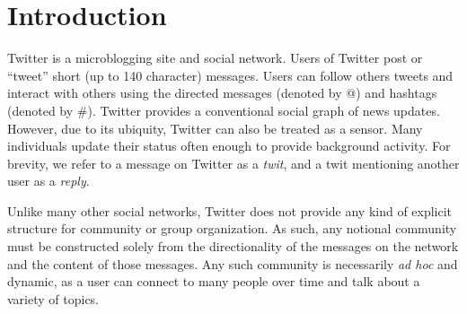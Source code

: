 \section{Introduction}

Twitter is a microblogging site and social network.  Users of Twitter post or ``tweet'' short (up to 140 character) messages.  Users can follow others tweets and interact with others using the directed messages (denoted by @) and hashtags (denoted by \#). Twitter provides a conventional social graph of news updates.  However, due to its ubiquity, Twitter can also be treated as a sensor.  Many individuals update their status often enough to provide background activity.  For brevity, we refer to a message on Twitter as a \emph{twit}, and a twit mentioning another user as a \emph{reply}.

Unlike many other social networks, Twitter does not provide any kind of explicit structure for community or group organization.  As such, any notional community must be constructed solely from the directionality of the messages on the network and the content of those messages.  Any such community is necessarily \emph{ad hoc} and dynamic, as a user can connect to many people over time and talk about a variety of topics.
